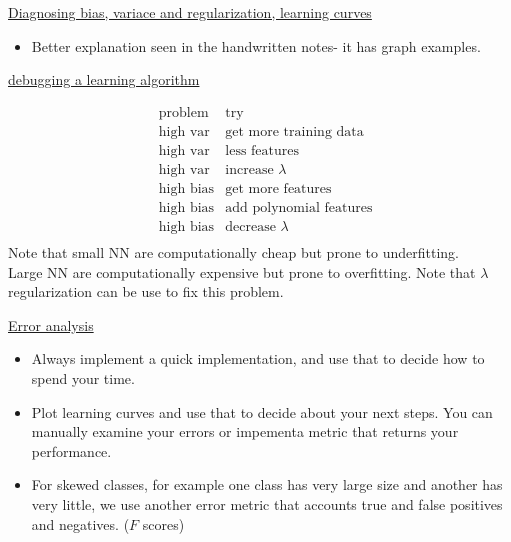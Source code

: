 \documentclass[12pt]{article}
\begin{document}
\underline{Diagnosing bias, variace and  regularization,  learning curves}

\begin{itemize}
	\item Better explanation seen in the handwritten notes- it has graph examples.

\end{itemize}

\underline{debugging a learning algorithm}

	\begin{align*}
	&\text{problem} &\text{try}\\
	&\text{high var} &\text{get more training data}\\
	&\text{high var} &\text{less features}\\
	&\text{high var}&\text{increase }\lambda\\
	&\text{high bias} &\text{get more features}\\
	&\text{high bias} &\text{add polynomial features}\\
	&\text{high bias} &\text{decrease }\lambda\\	
	\end{align*}
	Note that small NN are computationally cheap but prone to underfitting.\\
	Large NN are computationally expensive but prone to overfitting. Note that $\lambda$ regularization can be use to fix this problem.

\underline{Error analysis}
\begin{itemize}
	\item Always implement a quick implementation, and use that to decide how to spend your time.\\
	\item Plot learning curves and use that to decide about your next steps. You can manually examine your errors or impementa metric that returns your performance.
	\item For skewed classes, for example one class has very large size and another has very little, we use another error metric that accounts true and false positives and negatives. ($F$ scores)
\end{itemize}
\end{document}

